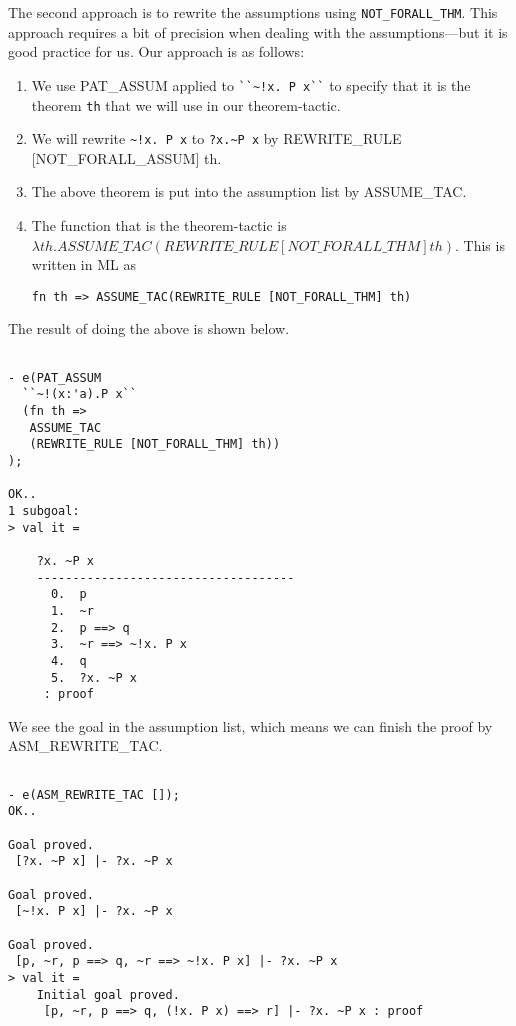 The second approach is to rewrite the assumptions using
\verb|NOT_FORALL_THM|. This approach requires a bit of precision when
dealing with the assumptions---but it is good practice for us. Our
approach is as follows:
\begin{enumerate}
\item We use PAT\_ASSUM applied to \verb|``~!x. P x``| to specify that
  it is the theorem \texttt{th} that we will use in our
  theorem-tactic.
\item We will rewrite \verb|~!x. P x| to \verb|?x.~P x| by
  REWRITE\_RULE [NOT\_FORALL\_ASSUM] th.
\item The above theorem is put into the assumption list by ASSUME\_TAC.
\item The function that is the theorem-tactic is $\lambda
  th.ASSUME\_TAC (REWRITE\_RULE [NOT\_FORALL\_THM] th)$. This is
  written in ML as
  \begin{center}
    \verb|fn th => ASSUME_TAC(REWRITE_RULE [NOT_FORALL_THM] th)|
  \end{center}
\end{enumerate}
The result of doing the above is shown below.
\begin{session}
  \begin{scriptsize}
\begin{verbatim}

- e(PAT_ASSUM
  ``~!(x:'a).P x``
  (fn th => 
   ASSUME_TAC
   (REWRITE_RULE [NOT_FORALL_THM] th))
);

OK..
1 subgoal:
> val it =
    
    ?x. ~P x
    ------------------------------------
      0.  p
      1.  ~r
      2.  p ==> q
      3.  ~r ==> ~!x. P x
      4.  q
      5.  ?x. ~P x
     : proof
\end{verbatim}
  \end{scriptsize}
\end{session}
We see the goal in the assumption list, which means we can finish the
proof by ASM\_REWRITE\_TAC.
\begin{session}
  \begin{scriptsize}
\begin{verbatim}

- e(ASM_REWRITE_TAC []);
OK..

Goal proved.
 [?x. ~P x] |- ?x. ~P x

Goal proved.
 [~!x. P x] |- ?x. ~P x

Goal proved.
 [p, ~r, p ==> q, ~r ==> ~!x. P x] |- ?x. ~P x
> val it =
    Initial goal proved.
     [p, ~r, p ==> q, (!x. P x) ==> r] |- ?x. ~P x : proof
\end{verbatim}
  \end{scriptsize}
\end{session}
